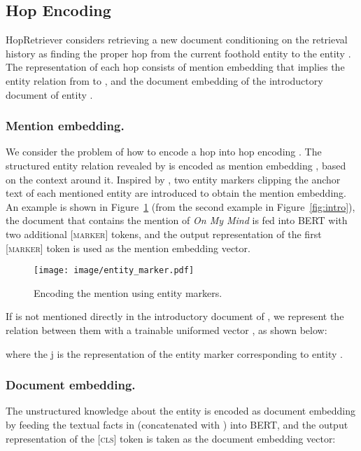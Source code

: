 \documentclass[letterpaper]{article} \usepackage{aaai21}  \usepackage{times}  \usepackage{helvet} \usepackage{courier}  \usepackage[hyphens]{url}  \usepackage{graphicx} \urlstyle{rm} \def\UrlFont{\rm}  \usepackage{graphicx}  \usepackage{natbib}  \usepackage{caption} \frenchspacing  \setlength{\pdfpagewidth}{8.5in}  \setlength{\pdfpageheight}{11in}
\begin{document}
\subsection{Hop Encoding}
\label{sec:hop_enc}

HopRetriever considers retrieving a new document  conditioning on the retrieval history as finding the proper hop from the current foothold entity  to the entity . The representation of each hop consists of mention embedding  that implies the entity relation from  to , and the document embedding  of the introductory document of entity . 

\subsubsection{Mention embedding.}
We consider the problem of how to encode a hop  into hop encoding . The structured entity relation revealed by  is encoded as mention embedding , based on the context around it. Inspired by \citet{matching-the-blanks}, two entity markers clipping the anchor text of each mentioned entity are introduced to obtain the mention embedding. An example is shown in Figure~\ref{fig:entity_marker} (from the second example in Figure~\ref{fig:intro}), the document that contains the mention of \textit{On My Mind} is fed into BERT with two additional \textsc{[marker]} tokens, and the output representation of the first \textsc{[marker]} token is used as the mention embedding vector.

\begin{figure}[h]
    \centering
    \texttt{[image: image/entity\_marker.pdf]}
    \caption{Encoding the mention using entity markers.}
    \label{fig:entity_marker}
\end{figure}

\noindent If  is not mentioned directly in the introductory document of , we represent the relation between them with a trainable uniformed vector , as shown below:

where the j is the representation of the entity marker corresponding to entity .

\subsubsection{Document embedding.}
The unstructured knowledge about the entity  is encoded as document embedding  by feeding the textual facts in  (concatenated with ) into BERT, and the output representation of the \textsc{[cls]} token is taken as the document embedding vector: 
\end{document}
